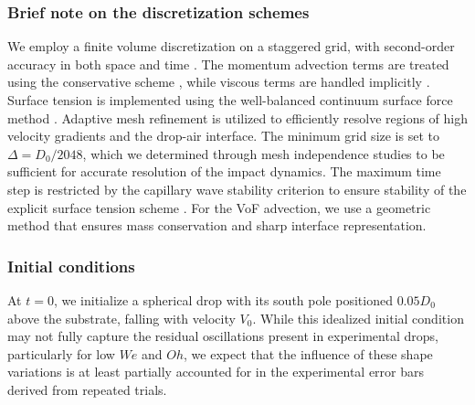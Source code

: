 \documentclass[reprint,amssymb,superscriptaddress,aps,prfluids,onecolumn]{revtex4-1}
\begin{document}
\subsubsection{Brief note on the discretization schemes}
We employ a finite volume discretization on a staggered grid, with second-order accuracy in both space and time \cite{popinet-basilisk}. The momentum advection terms are treated using the conservative scheme \cite{popinet-basilisk-momentum}, while viscous terms are handled implicitly \cite{popinet-basilisk-viscosity}. Surface tension is implemented using the well-balanced continuum surface force method \cite{popinet2018numerical,basiliskPopinet2}.
Adaptive mesh refinement is utilized to efficiently resolve regions of high velocity gradients and the drop-air interface. The minimum grid size is set to $\Delta = D_0/2048$, which we determined through mesh independence studies to be sufficient for accurate resolution of the impact dynamics.
The maximum time step is restricted by the capillary wave stability criterion to ensure stability of the explicit surface tension scheme \citep{popinet2009accurate,basiliskPopinet2}. For the VoF advection, we use a geometric method that ensures mass conservation and sharp interface representation.

\subsubsection{Initial conditions}
At $t=0$, we initialize a spherical drop with its south pole positioned $0.05D_0$ above the substrate, falling with velocity $V_0$. While this idealized initial condition may not fully capture the residual oscillations present in experimental drops, particularly for low $We$ and $Oh$, we expect that the influence of these shape variations is at least partially accounted for in the experimental error bars derived from repeated trials.
\end{document}
